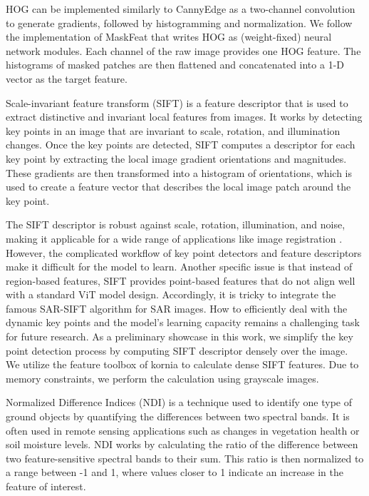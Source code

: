 \documentclass[lettersize,journal]{IEEEtran}
\begin{document}
HOG can be implemented similarly to CannyEdge as a two-channel convolution to generate gradients, followed by histogramming and normalization. We follow the implementation of MaskFeat \cite{wei2022masked} that writes HOG as (weight-fixed) neural network modules. Each channel of the raw image provides one HOG feature. The histograms of masked patches are then flattened and concatenated into a 1-D vector as the target feature.


\vspace{0.5em}
\hspace{0.3em}
Scale-invariant feature transform (SIFT) \cite{lowe2004distinctive} is a feature descriptor that is used to extract distinctive and invariant local features from images. It works by detecting key points in an image that are invariant to scale, rotation, and illumination changes. Once the key points are detected, SIFT computes a descriptor for each key point by extracting the local image gradient orientations and magnitudes. These gradients are then transformed into a histogram of orientations, which is used to create a feature vector that describes the local image patch around the key point. 

The SIFT descriptor is robust against scale, rotation, illumination, and noise, making it applicable for a wide range of applications like image registration \cite{ma2016remote}. However, the complicated workflow of key point detectors and feature descriptors make it difficult for the model to learn. Another specific issue is that instead of region-based features, SIFT provides point-based features that do not align well with a standard ViT model design. Accordingly, it is tricky to integrate the famous SAR-SIFT \cite{dellinger2014sar} algorithm for SAR images. How to efficiently deal with the dynamic key points and the model's learning capacity remains a challenging task for future research. As a preliminary showcase in this work, we simplify the key point detection process by computing SIFT descriptor densely over the image. We utilize the feature toolbox of kornia \cite{riba2020kornia} to calculate dense SIFT features. Due to memory constraints, we perform the calculation using grayscale images. 



\vspace{0.5em}
\hspace{0.3em}
Normalized Difference Indices (NDI) is a technique used to identify one type of ground objects by quantifying the differences between two spectral bands. It is often used in remote sensing applications such as changes in vegetation health or soil moisture levels. NDI works by calculating the ratio of the difference between two feature-sensitive spectral bands to their sum. This ratio is then normalized to a range between -1 and 1, where values closer to 1 indicate an increase in the feature of interest. 
\end{document}
